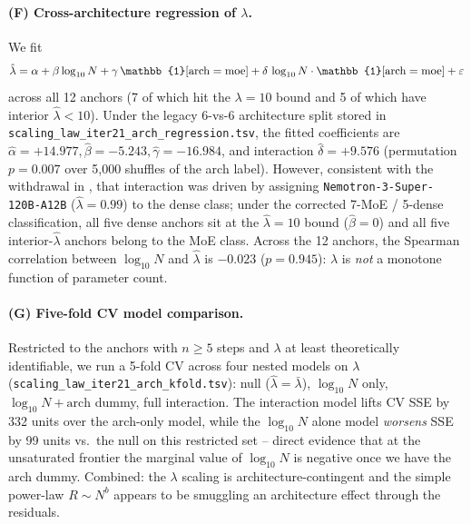 \paragraph{(F) Cross-architecture regression of $\lambda$.}
\label{par:scaling-iter21-arch-regression}
We fit
\begin{equation}
  \hat\lambda = \alpha + \beta \log_{10} N + \gamma\, \mathbb{1}[\mathrm{arch}=\mathrm{moe}] + \delta\, \log_{10} N \cdot \mathbb{1}[\mathrm{arch}=\mathrm{moe}] + \eps
  \label{eq:scaling-iter21-lambda-regression}
\end{equation}
across all 12 anchors (7 of which hit the $\lambda=10$ bound and 5 of
which have interior $\hat\lambda < 10$).  Under the legacy 6-vs-6
architecture split stored in
\texttt{scaling\_law\_iter21\_arch\_regression.tsv}, the fitted
coefficients are $\hat\alpha = +14.977, \hat\beta = -5.243,
\hat\gamma = -16.984$, and interaction $\hat\delta = +9.576$
(permutation $p = 0.007$ over 5{,}000 shuffles of the arch label).
However, consistent with the withdrawal in
, that interaction was driven by
assigning \texttt{Nemotron-3-Super-120B-A12B} ($\hat\lambda = 0.99$)
to the dense class; under the corrected 7-MoE / 5-dense
classification, all five dense anchors sit at the $\hat\lambda = 10$
bound ($\hat\beta = 0$) and all five interior-$\hat\lambda$ anchors
belong to the MoE class.  Across the 12 anchors, the Spearman
correlation between $\log_{10} N$ and $\hat\lambda$ is $-0.023$
($p = 0.945$): $\lambda$ is \emph{not} a monotone function of
parameter count.

\paragraph{(G) Five-fold CV model comparison.}
\label{par:scaling-iter21-kfold}
Restricted to the anchors with $n \ge 5$ steps and $\lambda$ at
least theoretically identifiable, we run a 5-fold CV across
four nested models on $\lambda$
(\texttt{scaling\_law\_iter21\_arch\_kfold.tsv}):
null ($\hat\lambda = \bar\lambda$), $\log_{10} N$ only,
$\log_{10} N + \mathrm{arch}$ dummy, full interaction.  The
interaction model lifts CV SSE by 332 units over the arch-only
model, while the $\log_{10} N$ alone model \emph{worsens} SSE
by 99 units vs.\ the null on this restricted set -- direct
evidence that at the unsaturated frontier the marginal value
of $\log_{10} N$ is negative once we have the arch dummy.
Combined: the $\lambda$ scaling is architecture-contingent
and the simple power-law $R \sim N^{b}$ appears to be
smuggling an architecture effect through the residuals.

